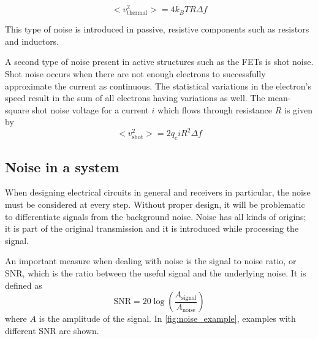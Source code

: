 			\begin{equation}
				< v^2_\text{thermal} > = 4k_BTR\Delta f
			\end{equation}

			This type of noise is introduced in passive, resistive components such as resistors and inductors.

			A second type of noise present in active structures such as the FETs is shot noise. Shot noise occurs when there are not enough electrons to successfully approximate the current as continuous. The statistical variations in the electron's speed result in the sum of all electrons having variations as well. The mean-square shot noise voltage for a current $i$ which flows through resistance $R$ is given by
			\begin{equation}
				< v^2_\text{shot} > = 2q_eiR^2\Delta f
			\end{equation}

		\subsection{Noise in a system}
			When designing electrical circuits in general and receivers in particular, the noise must be considered at every step. Without proper design, it will be problematic to differentiate signals from the background noise. Noise has all kinds of origins; it is part of the original transmission and it is introduced while processing the signal.

			An important measure when dealing with noise is the signal to noise ratio, or SNR, which is the ratio between the useful signal and the underlying noise. It is defined as
			\begin{equation}
					\text{SNR}=20\log \left(\frac{ A_\text{signal} }{ A_\text{noise} }\right)
			\end{equation}
			where $A$ is the amplitude of the signal. In \autoref{fig:noise_example}, examples with different SNR are shown.

